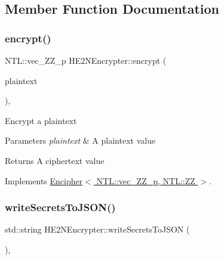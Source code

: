 \subsection{Member Function Documentation}
\mbox{\label{classHE2NEncrypter_aa7ae559f2407b7a5527bd42470224e1b}} 
\subsubsection{\texorpdfstring{encrypt()}{encrypt()}}
{\footnotesize\ttfamily N\+T\+L\+::vec\+\_\+\+Z\+Z\+\_\+p H\+E2\+N\+Encrypter\+::encrypt (\begin{DoxyParamCaption}\item[{N\+T\+L\+::\+ZZ \&}]{plaintext }\end{DoxyParamCaption})\hspace{0.3cm}{\ttfamily [override]}, {\ttfamily [virtual]}}

Encrypt a plaintext 
\begin{DoxyParams}{Parameters}
{\em plaintext} & A plaintext value \\
\hline
\end{DoxyParams}
\begin{DoxyReturn}{Returns}
A ciphertext value 
\end{DoxyReturn}


Implements \hyperlink{classEncipher_aaf8138eb280608bfd03c6eb762ffc010}{Encipher$<$ N\+T\+L\+::vec\+\_\+\+Z\+Z\+\_\+p, N\+T\+L\+::\+Z\+Z $>$}.

\mbox{\label{classHE2NEncrypter_a720d4ee52dadd55f61631554d2942a6b}} 
\subsubsection{\texorpdfstring{write\+Secrets\+To\+J\+S\+O\+N()}{writeSecretsToJSON()}}
{\footnotesize\ttfamily std\+::string H\+E2\+N\+Encrypter\+::write\+Secrets\+To\+J\+S\+ON (\begin{DoxyParamCaption}{ }\end{DoxyParamCaption})\hspace{0.3cm}{\ttfamily [override]}, {\ttfamily [virtual]}}

